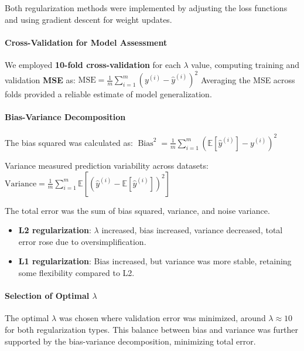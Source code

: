 \documentclass{article}
\begin{document}
Both regularization methods were implemented by adjusting the loss functions and using gradient descent for weight updates.

\paragraph{Cross-Validation for Model Assessment}
We employed \textbf{10-fold cross-validation} for each $\lambda$ value, computing training and validation \textbf{MSE} as:
$\mathrm{MSE}=\frac{1}{m} \sum_{i=1}^m\left(y^{(i)}-\hat{y}^{(i)}\right)^2$
Averaging the MSE across folds provided a reliable estimate of model generalization.

\paragraph{Bias-Variance Decomposition}
The bias squared was calculated as:
$\operatorname{Bias}^2=\frac{1}{m} \sum_{i=1}^m\left(\mathbb{E}\left[\hat{y}^{(i)}\right]-y^{(i)}\right)^2$

Variance measured prediction variability across datasets:
$\text{Variance}=\frac{1}{m} \sum_{i=1}^m \mathbb{E}\left[\left(\hat{y}^{(i)}-\mathbb{E}\left[\hat{y}^{(i)}\right]\right)^2\right]$

The total error was the sum of bias squared, variance, and noise variance.

\begin{itemize} \item \textbf{L2 regularization}: $\lambda$ increased, bias increased, variance decreased, total error rose due to oversimplification. \item \textbf{L1 regularization}: Bias increased, but variance was more stable, retaining some flexibility compared to L2. \end{itemize}

\paragraph{Selection of Optimal $\lambda$}
The optimal $\lambda$ was chosen where validation error was minimized, around $\lambda \approx 10$ for both regularization types. This balance between bias and variance was further supported by the bias-variance decomposition, minimizing total error.
\end{document}
